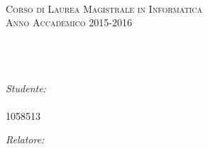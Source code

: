 \documentclass[
12pt, %
english, %
onehalfspacing, %
headsepline, %
]{MastersDoctoralThesis} %
\author{Carlo Maria \textsc{Massimo}} %
\begin{document}
\frontmatter %

\pagestyle{plain} %


\begin{titlepage}
\begin{center}

\textsc{\LARGE \univname}\\[1.5cm] %

 
\textsc{\Large Corso di Laurea Magistrale in Informatica}\\[0.5cm] %
\textsc{\large Anno Accademico 2015-2016}\\[2.5cm] %

\HRule \\[0.4cm] %
{\huge \bfseries \ttitle}\\[0.4cm] %
\HRule \\[1.5cm] %
 
\begin{minipage}{0.4\textwidth}
\begin{flushleft} \large
\emph{Studente:}\\
\authorname\\1058513 %
\end{flushleft}
\end{minipage}
\begin{minipage}{0.4\textwidth}
\begin{flushright} \large
\emph{Relatore:} \\
\supname %
\end{flushright}
\end{minipage}\\[3cm]
 
 
\vfill
\end{center}
\end{titlepage}
\end{document}
